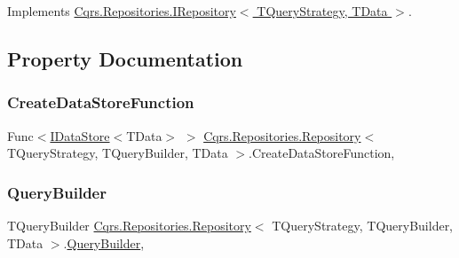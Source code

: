 Implements \hyperlink{interfaceCqrs_1_1Repositories_1_1IRepository_af8a0b1cf5eedd7653d2867ab38657d46}{Cqrs.\+Repositories.\+I\+Repository$<$ T\+Query\+Strategy, T\+Data $>$}.



\subsection{Property Documentation}
\mbox{\label{classCqrs_1_1Repositories_1_1Repository_ae15cee6394a223564ad2ead65cd30189}} 
\subsubsection{\texorpdfstring{Create\+Data\+Store\+Function}{CreateDataStoreFunction}}
{\footnotesize\ttfamily Func$<$\hyperlink{interfaceCqrs_1_1DataStores_1_1IDataStore}{I\+Data\+Store}$<$T\+Data$>$ $>$ \hyperlink{classCqrs_1_1Repositories_1_1Repository}{Cqrs.\+Repositories.\+Repository}$<$ T\+Query\+Strategy, T\+Query\+Builder, T\+Data $>$.Create\+Data\+Store\+Function\hspace{0.3cm}{\ttfamily [get]}, {\ttfamily [protected]}}

\mbox{\label{classCqrs_1_1Repositories_1_1Repository_a4447451b7dbcfcd68dfa3fa65a41f357}} 
\subsubsection{\texorpdfstring{Query\+Builder}{QueryBuilder}}
{\footnotesize\ttfamily T\+Query\+Builder \hyperlink{classCqrs_1_1Repositories_1_1Repository}{Cqrs.\+Repositories.\+Repository}$<$ T\+Query\+Strategy, T\+Query\+Builder, T\+Data $>$.\hyperlink{classCqrs_1_1Repositories_1_1Queries_1_1QueryBuilder}{Query\+Builder}\hspace{0.3cm}{\ttfamily [get]}, {\ttfamily [protected]}}

